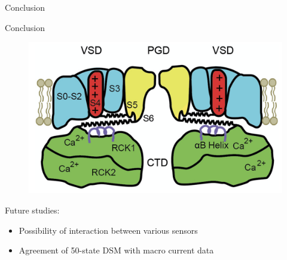 \documentclass{beamer}
\begin{document}
\begin{frame}[t]{Conclusion}
\begin{figure}
\centering
{}\qquad
{}

\qquad
{}
\vfill
\end{figure}
\end{frame}

\begin{frame}{Conclusion}
\begin{figure}
\centering
\includegraphics[width=.5\textwidth]{BK_Cartoon.png}
\end{figure}

Future studies:
\begin{itemize}
	\item Possibility of interaction between various sensors
	\item Agreement of 50-state DSM with macro current data
\end{itemize}

\end{frame}
\end{document}
